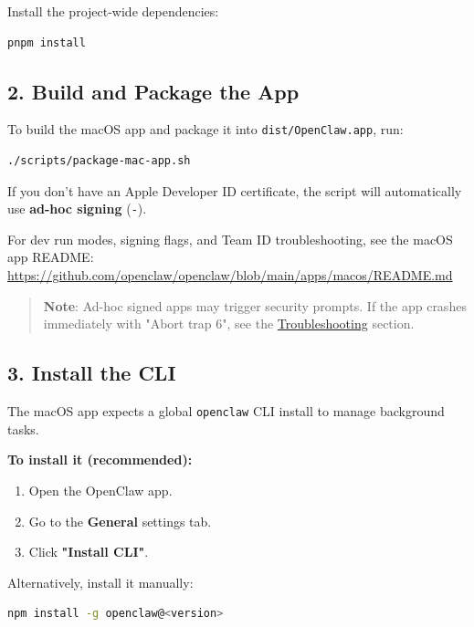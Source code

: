 Install the project-wide dependencies:

\begin{lstlisting}[language=bash]
pnpm install
\end{lstlisting}


\subsection{2. Build and Package the App}


To build the macOS app and package it into \texttt{dist/OpenClaw.app}, run:

\begin{lstlisting}[language=bash]
./scripts/package-mac-app.sh
\end{lstlisting}


If you don't have an Apple Developer ID certificate, the script will automatically use \textbf{ad-hoc signing} (\texttt{-}).

For dev run modes, signing flags, and Team ID troubleshooting, see the macOS app README:
\href{https://github.com/openclaw/openclaw/blob/main/apps/macos/README.md}{https://github.com/openclaw/openclaw/blob/main/apps/macos/README.md}

\begin{quote}
\textbf{Note}: Ad-hoc signed apps may trigger security prompts. If the app crashes immediately with "Abort trap 6", see the \href{\#troubleshooting}{Troubleshooting} section.
\end{quote}


\subsection{3. Install the CLI}


The macOS app expects a global \texttt{openclaw} CLI install to manage background tasks.

\textbf{To install it (recommended):}

\begin{enumerate}
  \item Open the OpenClaw app.
  \item Go to the \textbf{General} settings tab.
  \item Click \textbf{"Install CLI"}.
\end{enumerate}


Alternatively, install it manually:

\begin{lstlisting}[language=bash]
npm install -g openclaw@<version>
\end{lstlisting}


